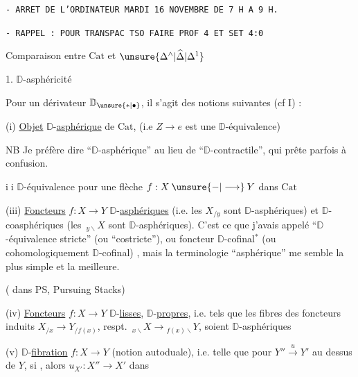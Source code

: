 \texttt{- ARRET DE L'ORDINATEUR MARDI 16 NOVEMBRE DE 7 H A 9 H.}

\texttt{- RAPPEL : POUR TRANSPAC TSO FAIRE PROF 4 ET SET 4:0}

Comparaison entre $\mathrm{Cat}$ et $\unsure{\Delta^{\wedge}|\widehat{\Delta}|\Delta^{1}}$

1.   $\mathbb D$-asphéricité\unsure{,|;}  

Pour un dérivateur $\mathbb D_{\unsure{*|\bullet}}$, il s'agit des notions suivantes (cf I) :

(i) \uline{Objet} $\mathbb D$-\uline{asphérique} de $\mathrm{Cat}$, (i.e $Z\longrightarrow e$ est une $\mathbb D$-équivalence)

NB Je préfère dire ``$\mathbb D$-asphérique'' au lieu de ``$\mathbb D$-contractile'', qui prête parfois à confusion.

\textcircled{\scriptsize ii} $\mathbb D$-équivalence pour une flèche $f:X\mathbin{\unsure{-|\longrightarrow}}Y$ dans $\mathrm{Cat}$

(iii) \uline{Foncteurs} $f:X\longrightarrow Y$ $\mathbb D$-\uline{asphériques} (i.e. les $X_{/y}$ sont $\mathbb D$-asphériques) et $\mathbb D$-coasphériques (les $\,{}_{y\backslash}X$ sont $\mathbb D$-asphériques). C'est ce que j'avais appelé ``$\mathbb D$-équivalence stricte'' (ou ``costricte''), ou foncteur  $\mathbb D$-cofinal$^{*}$ (ou cohomologiquement $\mathbb D$-cofinal) , mais la terminologie ``asphérique'' me semble la plus simple et la meilleure.

( dans PS, Pursuing Stacks)

(iv) \uline{Foncteurs} $f:X\longrightarrow Y$ $\mathbb D$-\uline{lisses}, $\mathbb D$-\uline{propres}, i.e. tels que les fibres des foncteurs induits $X_{/x}\longrightarrow Y_{/f(x)}$, respt. $\,{}_{x\backslash}X\longrightarrow{}_{f(x)\backslash}Y$, soient $\mathbb D$-asphériques

(v) $\mathbb D$-\uline{fibration} $f:X\longrightarrow Y$ (notion autoduale), i.e. telle que pour $Y''\xrightarrow{u}Y'$ au dessus de $Y$, si  , alors  $u_{X'}:X''\longrightarrow X'$ dans

